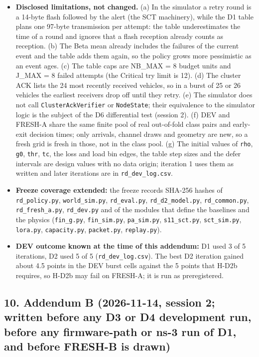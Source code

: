 \begin{itemize}
\item \textbf{Disclosed limitations, not changed.} (a) In the simulator a retry round is a 14-byte flash followed by the alert (the SCT machinery), while the D1 table plans one 97-byte transmission per attempt: the table underestimates the time of a round and ignores that a flash reception already counts as reception. (b) The Beta mean already includes the failures of the current event and the table adds them again, so the policy grows more pessimistic as an event ages. (c) The table caps are NB\_MAX = 8 budget units and J\_MAX = 8 failed attempts (the Critical try limit is 12). (d) The cluster ACK lists the 24 most recently received vehicles, so in a burst of 25 or 26 vehicles the earliest receivers drop off until they retry. (e) The simulator does not call \texttt{ClusterAckVerifier} or \texttt{NodeState}; their equivalence to the simulator logic is the subject of the D6 differential test (session 2). (f) DEV and FRESH-A share the same finite pool of real out-of-fold class pairs and early-exit decision times; only arrivals, channel draws and geometry are new, so a fresh grid is fresh in those, not in the class pool. (g) The initial values of \texttt{rho}, \texttt{g0}, \texttt{thr}, \texttt{tc}, the loss and load bin edges, the table step sizes and the defer intervals are design values with no data origin; iteration 1 uses them as written and later iterations are in \texttt{rd\_dev\_log.csv}.
\item \textbf{Freeze coverage extended:} the freeze records SHA-256 hashes of \texttt{rd\_policy.py}, \texttt{world\_sim.py}, \texttt{rd\_eval.py}, \texttt{rd\_d2\_model.py}, \texttt{rd\_common.py}, \texttt{rd\_fresh\_a.py}, \texttt{rd\_dev.py} and of the modules that define the baselines and the physics (\texttt{fin\_g.py}, \texttt{fin\_sim.py}, \texttt{pa\_sim.py}, \texttt{s11\_sct.py}, \texttt{sct\_sim.py}, \texttt{lora.py}, \texttt{capacity.py}, \texttt{packet.py}, \texttt{replay.py}).
\item \textbf{DEV outcome known at the time of this addendum:} D1 used 3 of 5 iterations, D2 used 5 of 5 (\texttt{rd\_dev\_log.csv}). The best D2 iteration gained about 4.5 points in the DEV burst cells against the 5 points that H-D2b requires, so H-D2b may fail on FRESH-A; it is run as preregistered.
\end{itemize}


\subsection*{10. Addendum B (2026-11-14, session 2; written before any D3 or D4 development run, before any firmware-path or ns-3 run of D1, and before FRESH-B is drawn)}

